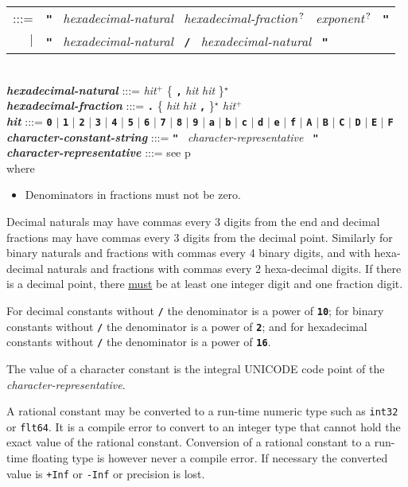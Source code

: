 \documentclass[12pt]{article}
\newcommand{\TT}[1]{{\tt \bfseries #1}}
\newcommand{\STAR}{{\Large $^\star$}}
\newcommand{\PLUS}[1][]{{$^{+#1}$}}
\newcommand{\QMARK}{{$^{\,\mbox{\footnotesize ?}}$}}
\newcommand{\emkey}[1]{{\em \bfseries #1}}
\newcommand{\pagref}[1]{p\pageref{#1}}
\newenvironment{indpar}[1][0.3in]%
	{\begin{list}{}%
		     {\setlength{\itemsep}{0in}%
		      \setlength{\topsep}{0in}%
		      \setlength{\parsep}{1ex}%
		      \setlength{\labelwidth}{#1}%
		      \setlength{\leftmargin}{#1}%
		      \addtolength{\leftmargin}{\labelsep}}%
	 \item}%
	{\end{list}}
\begin{document}
\begin{indpar}
\begin{tabular}[t]{@{}rl}
    :::= & \TT{"}~ {\em hexadecimal-natural}~
                   {\em hexadecimal-fraction}\QMARK{}~
		   {\em exponent}\QMARK{}~ \TT{"} \\
     $|$ & \TT{"}~ {\em hexadecimal-natural}~ \TT{/}~
                   {\em hexadecimal-natural}~ \TT{"} \\
    \end{tabular}
\\[0.5ex]
\emkey{hexadecimal-natural}
    :::= {\em hit}\PLUS{}
           \{ \TT{,} {\em hit} {\em hit} \}\STAR{} \\
\emkey{hexadecimal-fraction} :::=
    \TT{.} \{ {\em hit} {\em hit} \TT{,} \}\STAR{}
    {\em hit}\PLUS{} \\
\emkey{hit} :::= \TT{0} $|$ \TT{1} $|$ \TT{2} $|$ \TT{3} $|$ \TT{4}
	     $|$ \TT{5} $|$ \TT{6} $|$ \TT{7} $|$ \TT{8} $|$ \TT{9}
	     $|$ \TT{a} $|$ \TT{b} $|$ \TT{c} $|$ \TT{d} $|$ \TT{e} $|$ \TT{f}
	     $|$ \TT{A} $|$ \TT{B} $|$ \TT{C} $|$ \TT{D} $|$ \TT{E} $|$ \TT{F}
\\[0.5ex]
\emkey{character-constant-string} :::=
	\TT{"}~ {\em character-representative}~ \TT{"}
\\[0.5ex]
\emkey{character-representative} :::= see \pagref{CHARACTER-REPRESENTATIVE}
\\[1ex]
where
\begin{itemize}
\item Denominators in fractions must not be zero.
\end{itemize}

\end{indpar}

Decimal naturals may have commas
every 3 digits from the end and decimal fractions may have
commas every 3 digits from the decimal point.
Similarly for binary naturals and fractions with commas every 4 binary
digits,
and with hexa-decimal naturals and fractions with commas every 2
hexa-decimal digits.
If there is a decimal point, there \underline{must}
be at least one integer digit and
one fraction digit.

For decimal constants without \TT{/} the denominator is a power of \TT{10}; for
binary constants without \TT{/} the denominator is a power of \TT{2}; and for
hexadecimal constants without \TT{/} the denominator is a power of \TT{16}.

The value of a character constant is the integral UNICODE code point of the
{\em character-representative}.

A rational constant may be converted to a run-time numeric
type such as {\tt int32} or {\tt flt64}.
It is a compile error to convert to an integer type that cannot
hold the exact value of the rational constant.
Conversion of a rational constant
to a run-time floating type is however
never a compile error.  If necessary the converted value is
{\tt +Inf} or {\tt -Inf} or precision is lost.
\end{document}
